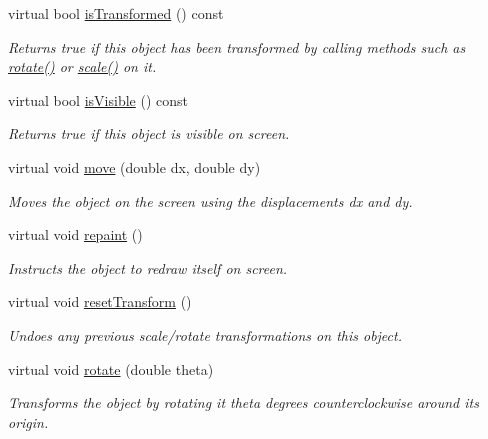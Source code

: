 \begin{DoxyCompactItemize}
virtual bool \mbox{\hyperlink{classsgl_1_1GObject_a9de207581cfa4ca1eaa06da5f29b75fc}{is\+Transformed}} () const
\begin{DoxyCompactList}\small\item\em Returns {\ttfamily true} if this object has been transformed by calling methods such as \mbox{\hyperlink{classsgl_1_1GObject_ae1ffaa12185dfd5ba464f7d87c329e26}{rotate()}} or \mbox{\hyperlink{classsgl_1_1GObject_ad2e1900f730475c2d044817db03b38d6}{scale()}} on it. \end{DoxyCompactList}\item 
virtual bool \mbox{\hyperlink{classsgl_1_1GObject_a9d8a6cfb13917785c143e74d40e4e2be}{is\+Visible}} () const
\begin{DoxyCompactList}\small\item\em Returns {\ttfamily true} if this object is visible on screen. \end{DoxyCompactList}\item 
virtual void \mbox{\hyperlink{classsgl_1_1GObject_a5973d8dda83afb36e2c56855515be392}{move}} (double dx, double dy)
\begin{DoxyCompactList}\small\item\em Moves the object on the screen using the displacements {\ttfamily dx} and {\ttfamily dy}. \end{DoxyCompactList}\item 
virtual void \mbox{\hyperlink{classsgl_1_1GObject_ac827b978aa122f136a14c198687ad80f}{repaint}} ()
\begin{DoxyCompactList}\small\item\em Instructs the object to redraw itself on screen. \end{DoxyCompactList}\item 
virtual void \mbox{\hyperlink{classsgl_1_1GObject_a6022a1fd1e5dcd2fd5585e5a36aa3f37}{reset\+Transform}} ()
\begin{DoxyCompactList}\small\item\em Undoes any previous scale/rotate transformations on this object. \end{DoxyCompactList}\item 
virtual void \mbox{\hyperlink{classsgl_1_1GObject_ae1ffaa12185dfd5ba464f7d87c329e26}{rotate}} (double theta)
\begin{DoxyCompactList}\small\item\em Transforms the object by rotating it {\ttfamily theta} degrees counterclockwise around its origin. \end{DoxyCompactList}\item 

\end{DoxyCompactItemize}

